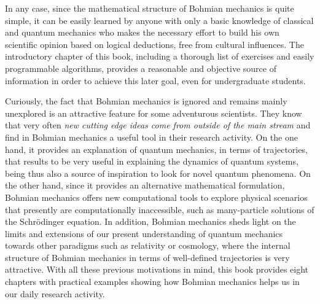 \documentclass[onecolumn,nofootinbib, secnumarabic, amsmath, nobibnotes,11pt,aps,pra]{revtex4-1}
\begin{document}
In any case, since the mathematical structure of Bohmian mechanics is quite simple, it can be easily learned by anyone with only a basic knowledge of classical and quantum mechanics who makes the necessary effort to build his own scientific opinion based on logical deductions, free from cultural influences. The introductory chapter of this book, including a thorough list of exercises and easily programmable algorithms, provides a reasonable and objective source of information in order to achieve this later goal, even for undergraduate students.

Curiously, the fact that Bohmian mechanics is ignored and remains mainly unexplored is an attractive feature for some adventurous scientists. They know that very often \emph{new cutting edge ideas come from outside of the main stream} and find in Bohmian mechanics a useful tool in their research activity. On the one hand, it provides an explanation of quantum mechanics, in terms of trajectories, that results to be very useful in explaining the dynamics of quantum systems, being thus also a source of inspiration to look for novel quantum phenomena. On the other hand, since it provides an alternative mathematical formulation, Bohmian mechanics offers new computational tools to explore physical scenarios that presently are computationally inaccessible, such as many-particle solutions of the Schr\"odinger equation. In addition, Bohmian mechanics sheds light on the limits and extensions of our present understanding of quantum mechanics towards other paradigms such as relativity or cosmology, where the internal structure of Bohmian mechanics in terms of well-defined trajectories is very attractive. With all these previous motivations in mind, this book provides eight chapters with practical examples showing how Bohmian mechanics helps us in our daily research activity.
\end{document}
